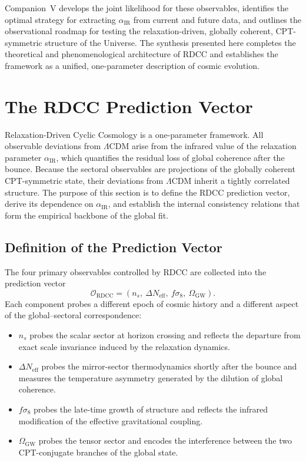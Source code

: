 \documentclass[11pt,a4paper]{article}
\begin{document}
Companion~V develops the joint likelihood for these observables, identifies the optimal strategy
for extracting $\alpha_{\mathrm{IR}}$ from current and future data, and outlines the observational
roadmap for testing the relaxation-driven, globally coherent, CPT-symmetric structure of the
Universe. The synthesis presented here completes the theoretical and phenomenological
architecture of RDCC and establishes the framework as a unified, one-parameter description of
cosmic evolution.

\section{The RDCC Prediction Vector}

Relaxation-Driven Cyclic Cosmology is a one-parameter framework. All observable deviations
from $\Lambda$CDM arise from the infrared value of the relaxation parameter
$\alpha_{\mathrm{IR}}$, which quantifies the residual loss of global coherence after the bounce.
Because the sectoral observables are projections of the globally coherent CPT-symmetric state,
their deviations from $\Lambda$CDM inherit a tightly correlated structure. The purpose of this
section is to define the RDCC prediction vector, derive its dependence on $\alpha_{\mathrm{IR}}$, and
establish the internal consistency relations that form the empirical backbone of the global fit.

\subsection{Definition of the Prediction Vector}

The four primary observables controlled by RDCC are collected into the prediction vector
\begin{equation}
    \mathcal{O}_{\mathrm{RDCC}} = (n_s,\ \Delta N_{\mathrm{eff}},\ f\sigma_8,\ \Omega_{\mathrm{GW}}).
\end{equation}
Each component probes a different epoch of cosmic history and a different aspect of the
global--sectoral correspondence:

\begin{itemize}
    \item $n_s$ probes the scalar sector at horizon crossing and reflects the departure from
    exact scale invariance induced by the relaxation dynamics.
    \item $\Delta N_{\mathrm{eff}}$ probes the mirror-sector thermodynamics shortly after the bounce
    and measures the temperature asymmetry generated by the dilution of global coherence.
    \item $f\sigma_8$ probes the late-time growth of structure and reflects the infrared modification
    of the effective gravitational coupling.
    \item $\Omega_{\mathrm{GW}}$ probes the tensor sector and encodes the interference between the
    two CPT-conjugate branches of the global state.
\end{itemize}
\end{document}
